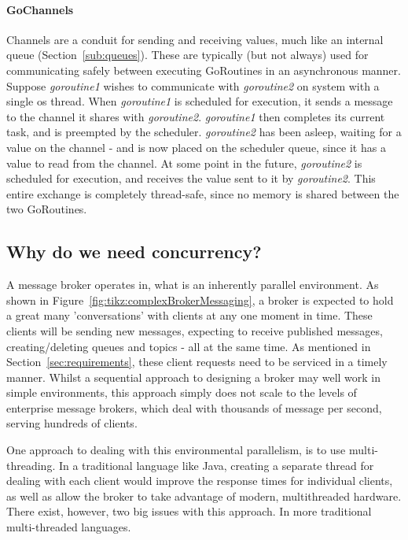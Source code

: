 \paragraph{GoChannels}

Channels are a conduit for sending and receiving values, much like an internal
queue (Section~\ref{sub:queues}). These are typically (but not always) used for
communicating safely between executing GoRoutines in an asynchronous manner.
Suppose \textit{goroutine1} wishes to communicate with \textit{goroutine2} on
system with a single \gls{os} thread. When \textit{goroutine1} is scheduled for
execution, it sends a message to the channel it shares with \textit{goroutine2}.
\textit{goroutine1} then completes its current task, and is \gls{preempted} by
the scheduler. \textit{goroutine2} has been asleep, waiting for a value on the
channel - and is now placed on the scheduler queue, since it has a value to read
from the channel. At some point in the future, \textit{goroutine2} is scheduled
for execution, and receives the value sent to it by \textit{goroutine2}. This
entire exchange is completely thread-safe, since no memory is shared between the
two GoRoutines.

\subsection{Why do we need concurrency?}
\label{sub:whyConcurrency}

A message broker operates in, what is an inherently parallel environment. As
shown in Figure~\ref{fig:tikz:complexBrokerMessaging}, a broker is expected to
hold a great many 'conversations' with clients at any one moment in time. These
clients will be sending new messages, expecting to receive published messages,
creating/deleting queues and topics - all at the same time. As mentioned in
Section~\ref{sec:requirements}, these client requests need to be serviced in a
timely manner. Whilst a sequential approach to designing a broker may well work
in simple environments, this approach simply does not scale to the levels of
enterprise message brokers, which deal with thousands of message per second,
serving hundreds of clients.

One approach to dealing with this environmental parallelism, is to use
multi-threading. In a traditional language like Java, creating a separate thread
for dealing with each client would improve the response times for individual
clients, as well as allow the broker to take advantage of modern, multithreaded
hardware. There exist, however, two big issues with this approach. In more
traditional multi-threaded languages.

